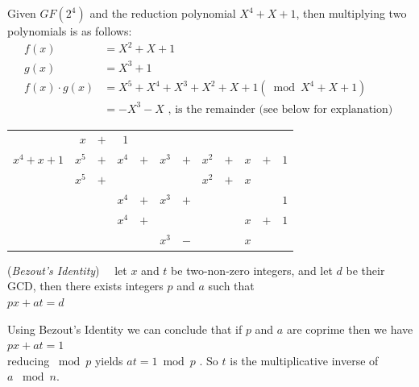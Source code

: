 \begin{eg} Given $GF(2^4)$ and the reduction polynomial $X^4 + X + 1$, then multiplying two polynomials is as follows:
\begin{align*}	
	f(x) &=  X^2 + X + 1\\
	g(x) &= X^3 + 1\\
 f(x) \cdot g(x) &= X^5 + X^4 + X^3 + X^2 + X + 1 (\bmod X^4 + X + 1)\\ 
	       &= - X^3 - X \text{ , is the remainder (see below for explanation) }
\end{align*}
\begin{center}
\begin{tabular}{rrcrcrcrcrcr}
        &  $x$  &  $+$  &      $1$         \\ \cline{2-12}
 \multicolumn{1}{r|}{$x^4 + x + 1$}
        &  $x^5$  &  $+$  &  $x^4$  &  $+$  & $ x^3$  &  $+$  &  $x^2$  &  $+$  & $ x$  &  $+$  &  $1$  \\
        & $x^5$   &  $+$  &       	&          &      	  &          &  $x^2$   & $+$  &  $x$     \\ \cline{2-12}
        &         &       &         $x^4$  & $+$   &  $ x^3$  &   $+$  &             &         &         &          &  $1$  \\
        &         &       &         $x^4$  &  $+$  &             &           &              &         &  $x$   & $+$  &  $1$   \\ \cline{4-12}
        &         &       &                    &          &   $x^3$ &    $-$  &              &         &  $x$    
\end{tabular}
\end{center}
\end{eg}

\begin{defn} \label{def:Bezout's Identity}(\emph{Bezout's Identity})~~ let $x$ and $t$ be two-non-zero integers, and let $d$ be their GCD, then there exists integers $p$ and $a$ such that\\
 \hspace*{\parindent} $px + at = d$
\end{defn}
\begin{corollary}
Using Bezout's Identity we can conclude that if $p$ and $a$ are coprime then we have\\
\hspace*{\parindent} $px + at = 1$ \\
reducing $\bmod p$ yields $at = 1 \bmod p$ .  So $t$ is the multiplicative inverse of\\
 $a$ $\bmod n$.
\end{corollary}

